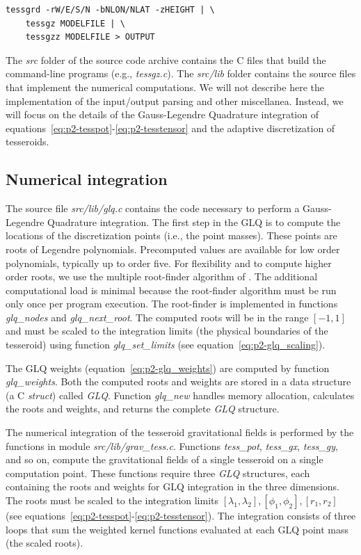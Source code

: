 \begin{verbatim}
tessgrd -rW/E/S/N -bNLON/NLAT -zHEIGHT | \
    tessgz MODELFILE | \
    tessgzz MODELFILE > OUTPUT
\end{verbatim}

The \emph{src} folder of the source code archive
contains the C files that build the command-line programs
(e.g., \emph{tessgz.c}).
The \emph{src/lib} folder contains
the source files that implement the numerical computations.
We will not describe here the implementation of the input/output parsing and
other miscellanea.
Instead, we will focus on the details of the Gauss-Legendre Quadrature
integration of equations~\ref{eq:p2-tesspot}-\ref{eq:p2-tesstensor}
and the adaptive discretization of tesseroids.



\subsection{Numerical integration}

The source file \emph{src/lib/glq.c}
contains the code necessary to perform
a Gauss-Legendre Quadrature integration.
The first step in the GLQ is to compute the
locations of the discretization points (i.e., the point masses).
These points are roots of Legendre polynomials.
Precomputed values are available for low order polynomials,
typically up to order five.
For flexibility and to compute higher order roots,
we use the multiple root-finder algorithm of
\citet{barrera-figueroa2006}.
The additional computational load is minimal
because the root-finder algorithm
must be run only once per program execution.
The root-finder is implemented in functions
\emph{glq\_nodes} and \emph{glq\_next\_root}.
The computed roots will be in the range $[-1, 1]$
and must be scaled to the integration limits
(the physical boundaries of the tesseroid)
using function \emph{glq\_set\_limits} (see equation~\ref{eq:p2-glq_scaling}).

The GLQ weights (equation~\ref{eq:p2-glq_weights})
are computed by function \emph{glq\_weights}.
Both the computed roots and weights are stored in a data structure
(a C \emph{struct}) called \emph{GLQ}.
Function \emph{glq\_new}
handles memory allocation,
calculates the roots and weights,
and returns the complete \emph{GLQ} structure.

The numerical integration of the tesseroid gravitational fields
is performed by the functions in module \emph{src/lib/grav\_tess.c}.
Functions \emph{tess\_pot}, \emph{tess\_gx}, \emph{tess\_gy}, and so on,
compute the gravitational fields of a single tesseroid
on a single computation point.
These functions require three \emph{GLQ} structures,
each containing the roots and weights
for GLQ integration in the three dimensions.
The roots must be scaled to the
integration limits
$[\lambda_1, \lambda_2], [\phi_1, \phi_2], [r_1, r_2]$
(see equations~\ref{eq:p2-tesspot}-\ref{eq:p2-tesstensor}).
The integration consists of three loops
that sum the weighted kernel functions
evaluated at each GLQ point mass (the scaled roots).

